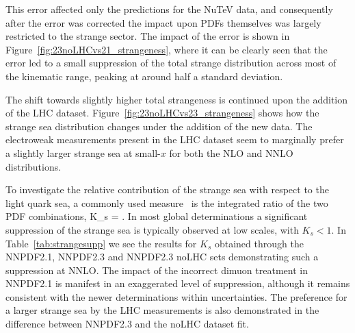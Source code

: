 This error affected only the predictions for the NuTeV data, and consequently after the error was corrected the impact upon PDFs themselves was largely restricted to the strange sector. The impact of the error is shown in Figure~\ref{fig:23noLHCvs21_strangeness}, where it can be clearly seen that the error led to a small suppression of the total strange distribution across most of the kinematic range, peaking at around half a standard deviation.

The shift towards slightly higher total strangeness is continued upon the addition of the LHC dataset. Figure~\ref{fig:23noLHCvs23_strangeness} shows how the strange sea distribution changes under the addition of the new data. The electroweak measurements present in the LHC dataset seem to marginally prefer a slightly larger strange sea at small-$x$ for both the NLO and NNLO distributions.

To investigate the relative contribution of the strange sea with respect to the light quark sea, a commonly used measure~\cite{Lai:2007dq,Alekhin:2008mb,Martin:2009iq,Ball:2009mk}
 is the integrated ratio of the two PDF combinations,
\be
K_s = .
\ee
In most global determinations a significant suppression of the strange sea is typically observed at low scales, with $K_s < 1$. In Table~\ref{tab:strangesupp} we see the results for $K_s$ obtained through the NNPDF2.1, NNPDF2.3 and NNPDF2.3 noLHC sets demonstrating such a suppression at NNLO. The impact of the incorrect dimuon treatment in NNPDF2.1 is manifest in an exaggerated level of suppression, although it remains consistent with the newer determinations within uncertainties. The preference for a larger strange sea by the LHC measurements is also demonstrated in the difference between NNPDF2.3 and the noLHC dataset fit.


